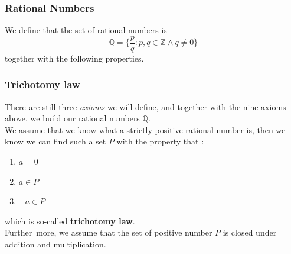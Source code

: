 \documentclass[12pt, t]{beamer}
\renewcommand{\emph}[1]{{\color{Turquoise3}\textsl{#1}}}
\begin{document}
\begin{frame}
    \frametitle{Rational Numbers}
    We define that the set of rational numbers is
    \begin{equation*}
        \mathbb{Q}=\{\frac{p}{q}:p,q\in \mathbb{Z}\wedge q \neq 0\}
    \end{equation*}
    together with the following properties.
    \begin{table}
        \centering
    \end{table}
\end{frame}

\begin{frame}
    \frametitle{Trichotomy law}
    There are still three \emph{axioms} we will define, and together with the nine axioms above,
    we build our rational numbers $\mathbb{Q}$.\\
    \vspace{1em}
    We assume that we know what a strictly positive rational number is, then we know we can find such
    a set $P$ with the property that :
    \begin{enumerate}
        \item $a=0$
        \item $a\in P$
        \item $-a\in P$
    \end{enumerate}
    which is so-called \textbf{trichotomy law}.\\
    Further more, we assume that the set of positive number $P$ is closed under addition and multiplication.\\
\end{frame}
\end{document}
